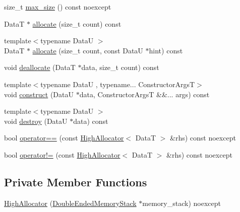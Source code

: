 \begin{DoxyCompactItemize}
\item 
size\+\_\+t \hyperlink{structmage_1_1_double_ended_memory_stack_1_1_high_allocator_a6adfd0ed341c637ce0d0edc9d3d02c27}{max\+\_\+size} () const noexcept
\item 
DataT $\ast$ \hyperlink{structmage_1_1_double_ended_memory_stack_1_1_high_allocator_ab6585eebb7bb11dcee1945b11b50ea98}{allocate} (size\+\_\+t count) const
\item 
{\footnotesize template$<$typename DataU $>$ }\\DataT $\ast$ \hyperlink{structmage_1_1_double_ended_memory_stack_1_1_high_allocator_aedb3ef31fc451aee62e814d8c617678f}{allocate} (size\+\_\+t count, const DataU $\ast$hint) const
\item 
void \hyperlink{structmage_1_1_double_ended_memory_stack_1_1_high_allocator_a5d44eaa0a79fa5bab33041a239567017}{deallocate} (DataT $\ast$data, size\+\_\+t count) const
\item 
{\footnotesize template$<$typename DataU , typename... Constructor\+ArgsT$>$ }\\void \hyperlink{structmage_1_1_double_ended_memory_stack_1_1_high_allocator_ae52a710da5593ac53d57c249f451bec6}{construct} (DataU $\ast$data, Constructor\+ArgsT \&\&... args) const
\item 
{\footnotesize template$<$typename DataU $>$ }\\void \hyperlink{structmage_1_1_double_ended_memory_stack_1_1_high_allocator_a59a29334c0812bf6037ebb74361e0598}{destroy} (DataU $\ast$data) const
\item 
bool \hyperlink{structmage_1_1_double_ended_memory_stack_1_1_high_allocator_a1cc9124a1c31f2162a67662ee996dff4}{operator==} (const \hyperlink{structmage_1_1_double_ended_memory_stack_1_1_high_allocator}{High\+Allocator}$<$ DataT $>$ \&rhs) const noexcept
\item 
bool \hyperlink{structmage_1_1_double_ended_memory_stack_1_1_high_allocator_a54019d2f65bcde7caf42dc507745e776}{operator!=} (const \hyperlink{structmage_1_1_double_ended_memory_stack_1_1_high_allocator}{High\+Allocator}$<$ DataT $>$ \&rhs) const noexcept
\end{DoxyCompactItemize}
\subsection*{Private Member Functions}
\begin{DoxyCompactItemize}
\item 
\hyperlink{structmage_1_1_double_ended_memory_stack_1_1_high_allocator_a6d51325f813c70290379dcb472d093c3}{High\+Allocator} (\hyperlink{classmage_1_1_double_ended_memory_stack}{Double\+Ended\+Memory\+Stack} $\ast$memory\+\_\+stack) noexcept
\end{DoxyCompactItemize}
